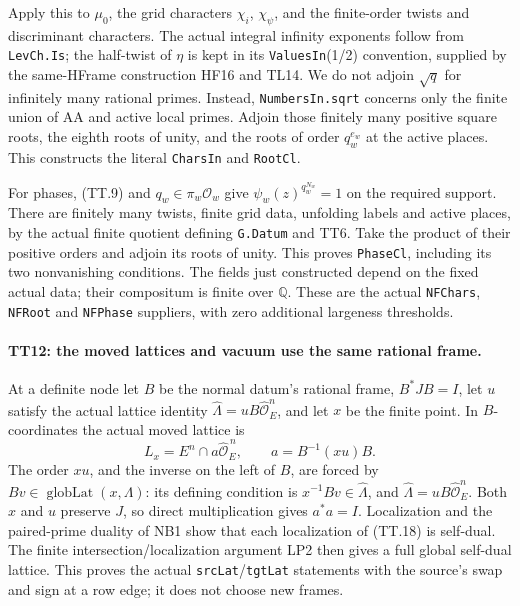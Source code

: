Apply this to $\mu_0$, the grid characters $\chi_i$,
$\chi_\psi$, and the finite-order twists and discriminant
characters. The actual integral infinity exponents follow from
\texttt{LevCh.Is}; the half-twist of $\eta$ is kept in its
\texttt{ValuesIn}(1/2) convention, supplied by the same-HFrame construction HF16 and TL14. We do not adjoin $\sqrt q$ for infinitely
many rational primes. Instead, \texttt{NumbersIn.sqrt} concerns
only the finite union of AA and active local primes. Adjoin those
finitely many positive square roots, the eighth roots of unity,
and the roots of order $q_w^{e_w}$ at the active places. This
constructs the literal \texttt{CharsIn} and \texttt{RootCl}.

For phases, (TT.9) and $q_w\in\pi_w\mathcal O_w$ give
$\psi_w(z)^{q_w^{N_w}}=1$ on the required support. There are
finitely many twists, finite grid data, unfolding labels and active
places, by the actual finite quotient defining \texttt{G.Datum}
and TT6. Take the product of their positive orders and adjoin
its roots of unity. This proves \texttt{PhaseCl}, including its
two nonvanishing conditions. The fields just constructed depend
on the fixed actual data; their compositum is finite over
$\mathbb Q$. These are the actual \texttt{NFChars},
\texttt{NFRoot} and \texttt{NFPhase} suppliers, with zero
additional largeness thresholds.

\paragraph{TT12: the moved lattices and vacuum use the same rational frame.}
At a definite node let $B$ be the normal datum's rational frame,
$B^*JB=I$, let $u$ satisfy the actual lattice identity
$\widehat\Lambda=uB\widehat{\mathcal O}_E^n$, and let $x$
be the finite point. In $B$-coordinates the
actual moved lattice is
\[
 L_x=E^n\cap a\widehat{\mathcal O}_E^{\,n},\qquad
             a=B^{-1}(x u)B.                               \tag{TT.18}
\]
The order $xu$, and the inverse on the left of $B$, are forced by
$Bv\in\operatorname{globLat}(x,\Lambda)$: its defining condition
is $x^{-1}Bv\in\widehat\Lambda$, and
$\widehat\Lambda=uB\widehat{\mathcal O}_E^n$.
Both $x$ and $u$ preserve $J$, so direct multiplication gives
$a^*a=I$. Localization and the paired-prime duality of NB1 show
that each localization of (TT.18) is self-dual. The finite
intersection/localization argument LP2 then gives a full global
self-dual lattice. This proves the actual
\texttt{srcLat}/\texttt{tgtLat} statements with the source's
swap and sign at a row edge; it does not choose new frames.

